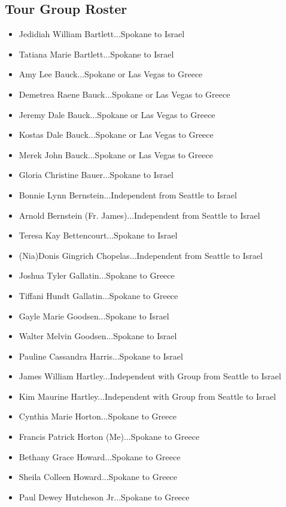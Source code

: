 \documentclass[letterpaper]{report}
\begin{document}
\begin{appendix}
	\chapter{Tour Group Roster}
	\begin{itemize}
		\item Jedidiah William Bartlett...Spokane to Israel
		\item Tatiana Marie Bartlett...Spokane to Israel
		\item Amy Lee Bauck...Spokane or Las Vegas to Greece
		\item Demetrea Raene Bauck...Spokane or Las Vegas to Greece
		\item Jeremy Dale Bauck...Spokane or Las Vegas to Greece
		\item Kostas Dale Bauck...Spokane or Las Vegas to Greece
		\item Merek John Bauck...Spokane or Las Vegas to Greece
		\item Gloria Christine Bauer...Spokane to Israel
		\item Bonnie Lynn Bernstein...Independent from Seattle to Israel
		\item Arnold Bernstein (Fr. James)...Independent from Seattle to Israel
		\item Teresa Kay Bettencourt...Spokane to Israel
		\item (Nia)Donis Gingrich Chopelas...Independent from Seattle to Israel
		\item Joshua Tyler Gallatin...Spokane to Greece
		\item Tiffani Hundt Gallatin...Spokane to Greece
		\item Gayle Marie Goodsen...Spokane to Israel
		\item Walter Melvin Goodsen...Spokane to Israel
		\item Pauline Cassandra Harris...Spokane to Israel
		\item James William Hartley...Independent with Group from Seattle to Israel
		\item Kim Maurine Hartley...Independent with Group from Seattle to Israel
		\item Cynthia Marie Horton...Spokane to Greece
		\item Francis Patrick Horton (Me)...Spokane to Greece
		\item Bethany Grace Howard...Spokane to Greece
		\item Sheila Colleen Howard...Spokane to Greece
		\item Paul Dewey Hutcheson Jr...Spokane to Greece

\end{itemize}
\end{appendix}
\end{document}
